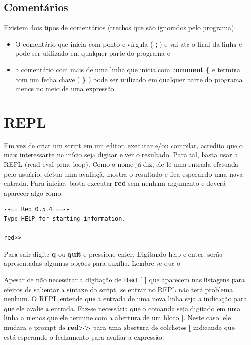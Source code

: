 \documentclass[12pt]{article}
\begin{document}
\subsection{Comentários}
Existem dois tipos de comentários (trechos que são ignorados pelo programa): 
\begin{itemize}
\item O comentário que inicia com ponto e vírgula ( \textbf{;} ) e vai até o
  final da linha e pode ser utilizado em qualquer parte do programa e
\item o comentário com mais de uma linha que inicia com \textbf{comment \{} e
  termina com um fecha chave ( \textbf{\}} ) pode ser utilizado em qualquer
  parte do programa menos no meio de uma expressão.
\end{itemize}

\section{REPL}
Em vez de criar um script em um editor, executar e/ou compilar, acredito que o 
mais interessante no início seja digitar e ver o resultado. Para tal, basta usar
o REPL (read-eval-print-loop). Como o nome já diz, ele lê uma entrada efetuada
pelo usuário, efetua uma avaliaçã, mostra o resultado e fica esperando uma nova
entrada. Para iniciar, basta executar \textbf{red} sem nenhum argumento e deverá
aparecer algo como:

\begin{shaded}
\begin{verbatim}
--== Red 0.5.4 ==-- 
Type HELP for starting information. 

red>>
\end{verbatim}
\end{shaded}

Para sair digite \textbf{q} ou \textbf{quit} e pressione enter. Digitando help e
enter, serão apresentadas algumas opções para auxílio. Lembre-se que o 

Apesar de não necessitar a digitação de \textbf{Red [ ]} que aparecem nas
listagens para efeitos de salientar a sintaxe do script, se entrar no REPL não
terá problema nenhum. O REPL entende que a entrada de uma nova linha seja a
indicação para que ele avalie a entrada. Faz-se necessário que o comando seja
digitado em uma linha a menos que ele termine com a abertura de um bloco
\textbf{[}. Neste caso, ele mudara o prompt de
\textbf{red\textgreater\textgreater} para uma abertura de colchetes  \textbf{[}
indicando que está esperando o fechamento para avaliar a expressão.
\end{document}
